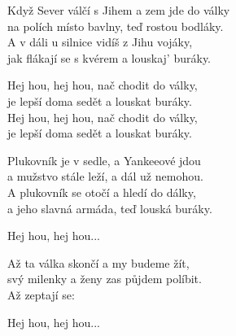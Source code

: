\ve{}
Když Sever válčí s Jihem a zem jde do války\\
na polích místo bavlny, teď rostou bodláky.\\
A v dáli u silnice vidíš z Jihu vojáky,\\
jak flákají se s kvérem a louskaj' buráky.

\cho{}
Hej hou, hej hou, nač chodit do války,\\
je lepší doma sedět a louskat buráky.\\
Hej hou, hej hou, nač chodit do války,\\
je lepší doma sedět a louskat buráky.

\ve{}
Plukovník je v sedle, a Yankeeové jdou\\
a mužstvo stále leží, a dál už nemohou.\\
A plukovník se otočí a hledí do dálky,\\
a jeho slavná armáda, teď louská buráky.

\cho{}
Hej hou, hej hou...

\ve{}
Až ta válka skončí a my budeme žít,\\
svý milenky a ženy zas půjdem políbit.\\
Až zeptají se: \\

\cho{}
Hej hou, hej hou...

\esong{}